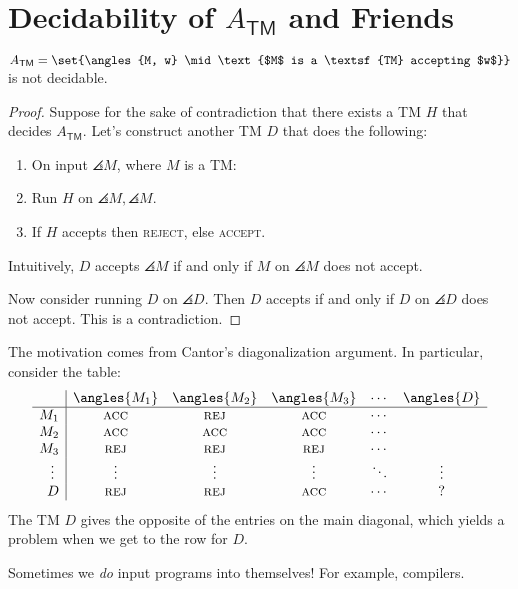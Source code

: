 \documentclass{standalone}
\begin{document}
\section{Decidability of \texorpdfstring{\(A_{\textsf{TM}}\)}{A\_TM} and Friends}
\begin{theorem}
	\(A_{\textsf{TM}} = \set{\angles{M, w} \mid \text{$M$ is a \textsf{TM} accepting $w$}}\) is not decidable.
\end{theorem}
\begin{proof}
	Suppose for the sake of contradiction that there exists a \textsf{TM} \(H\) that decides \(A_{\textsf{TM}}\). Let's construct another \textsf{TM} \(D\) that does the following:
	\begin{enumerate}[start=0]
		\item On input \(\angles{M}\), where \(M\) is a \textsf{TM}:
		\item Run \(H\) on \(\angles{M, \angles{M}}\).
		\item If \(H\) accepts then \textsc{reject}, else \textsc{accept}.
	\end{enumerate}
	
	Intuitively, \(D\) accepts \(\angles{M}\) if and only if \(M\) on \(\angles M\) does not accept.

	Now consider running \(D\) on \(\angles{D}\). Then \(D\) accepts if and only if \(D\) on \(\angles{D}\) does not accept. This is a contradiction.
\end{proof}

The motivation comes from Cantor's diagonalization argument. In particular, consider the table:
\[
	\begin{array}{r | c c c c c}
		    & \angles{M_1} & \angles{M_2} & \angles{M_3} & \cdots & \angles{D} \\ \hline
		M_1 & \textsc{acc} & \textsc{rej} & \textsc{acc} & \cdots & \\
		M_2 & \textsc{acc} & \textsc{acc} & \textsc{acc} & \cdots & \\
		M_3 & \textsc{rej} & \textsc{rej} & \textsc{rej} & \cdots & \\
		\vdots\,\, & \vdots & \vdots & \vdots & \ddots & \vdots \\
		D & \textsc{rej} & \textsc{rej} & \textsc{acc} & \cdots & ? \\
	\end{array}
\]
The \textsf{TM} \(D\) gives the opposite of the entries on the main diagonal, which yields a problem when we get to the row for \(D\).

\begin{note}
	Sometimes we \emph{do} input programs into themselves! For example, compilers.
\end{note}
\end{document}

